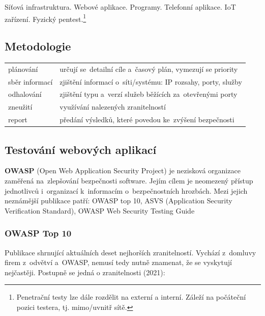 Síťová infrastruktura. Webové aplikace. Programy. Telefonní aplikace. IoT zařízení. Fyzický pentest.\footnote{Penetrační testy lze dále rozdělit na externí a interní. Záleží na počáteční pozici testera, tj. mimo/uvnitř sítě.}

\subsection{Metodologie}

\begin{table}[h]
    \centering
    \begin{tabular}{p{3cm}|p{12cm}}
        plánování      & určují se~detailní cíle a~časový plán, vymezují se priority  \\
        sběr informací & zjištění informací o~síti/systému: IP rozsahy, porty, služby \\
        odhalování     & zjištění typu a~verzí služeb běžících za~otevřenými porty    \\
        zneužití       & využívání nalezených zranitelností                           \\
        report         & předání výsledků, které povedou ke~zvýšení bezpečnosti       \\
    \end{tabular}
\end{table}

\subsection{Testování webových aplikací}

\textbf{OWASP} (Open Web Application Security Project) je nezisková organizace zaměřená na~zlepšování bezpečnosti software. Jejím cílem je neomezený přístup jednotlivců i~organizací k~informacím o~bezpečnostních hrozbách. Mezi jejich neznámější publikace patří: OWASP top 10, ASVS (Application Security Verification Standard), OWASP Web Security Testing Guide

\subsubsection{OWASP Top 10}

Publikace shrnující aktuálních deset nejhorších zranitelností. Vychází z~domluvy firem z~odvětví a~OWASP, nemusí tedy nutně znamenat, že se vyskytují nejčastěji. Postupně se jedná o zranitelnosti (2021):

